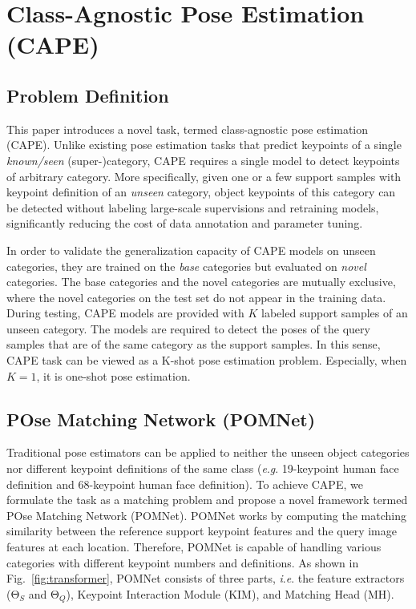 \documentclass[runningheads]{llncs}
\newcommand{\ie}{\textit{i}.\textit{e}. }
\newcommand{\eg}{\textit{e}.\textit{g}. }
\begin{document}
\section{Class-Agnostic Pose Estimation (CAPE)}

\subsection{Problem Definition}

This paper introduces a novel task, termed class-agnostic pose estimation (CAPE). Unlike existing pose estimation tasks that predict keypoints of a single \emph{known/seen} (super-)category, CAPE requires a single model to detect keypoints of arbitrary category. More specifically, given one or a few support samples with keypoint definition of an \emph{unseen} category, object keypoints of this category can be detected without labeling large-scale supervisions and retraining models, significantly reducing the cost of data annotation and parameter tuning.

In order to validate the generalization capacity of CAPE models on unseen categories, they are trained on the \emph{base} categories but evaluated on \emph{novel} categories. The base categories and the novel categories are mutually exclusive, where the novel categories on the test set do not appear in the training data. During testing, CAPE models are provided with $K$ labeled support samples of an unseen category. The models are required to detect the poses of the query samples that are of the same category as the support samples. In this sense, CAPE task can be viewed as a K-shot pose estimation problem. Especially, when $K=1$, it is one-shot pose estimation.  


\subsection{POse Matching Network (POMNet)}

Traditional pose estimators can be applied to neither the unseen object categories nor different keypoint definitions of the same class (\eg 19-keypoint human face definition and 68-keypoint human face definition). To achieve CAPE, we formulate the task as a matching problem and propose a novel framework termed POse Matching Network (POMNet). POMNet works by computing the matching similarity between the reference support keypoint features and the query image features at each location.
Therefore, POMNet is capable of handling various categories with different keypoint numbers and definitions.
As shown in Fig.~\ref{fig:transformer}, POMNet consists of three parts, \ie the feature extractors ($\mathrm{\Theta}_{S}$ and $\mathrm{\Theta}_{Q}$), Keypoint Interaction Module (KIM), and Matching Head (MH).
\end{document}
